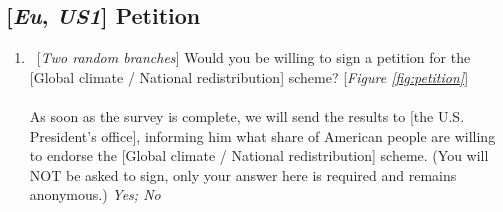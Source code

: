 \subsection*{[\textit{Eu}, \textit{US1}] Petition}
\begin{enumerate}[resume] \item ~[\textit{Two random branches}] \label{q:petition} Would you be willing to sign a petition for the [Global climate / National redistribution] scheme?  [\textit{Figure \ref{fig:petition}}]\\
\\
As soon as the survey is complete, we will send the results to [the U.S. President's office], informing him what share of American people are willing to endorse the [Global climate / National redistribution] scheme. (You will NOT be asked to sign, only your answer here is required and remains anonymous.) 
\textit{Yes; No}
\end{enumerate}

